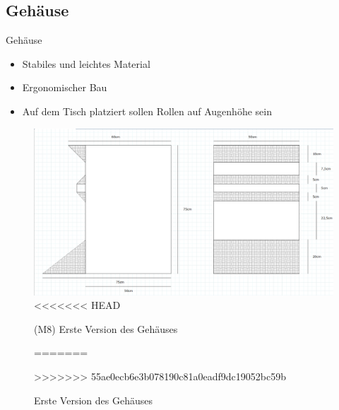\documentclass[mathserif,9pt]{article}
\begin{document}
    \subsection{Gehäuse}
    \begin{frame}{Gehäuse}
        \begin{block}{}
            \begin{itemize}
                \item Stabiles und leichtes Material
                \item Ergonomischer Bau
                \item Auf dem Tisch platziert sollen Rollen auf Augenhöhe sein
            \end{itemize}
            \begin{figure}
                \centering
                \includegraphics[height=0.4\paperheight]{img/gehause.png}
<<<<<<< HEAD
                \caption[M8]{(M8) Erste Version des Geh\"auses}
=======
                \caption{Erste Version des Geh\"auses}
>>>>>>> 55ae0ecb6e3b078190c81a0eadf9dc19052bc59b
                \label{fig:gehausev1}
            \end{figure}
        \end{block}
    \end{frame}
    
\end{document}
